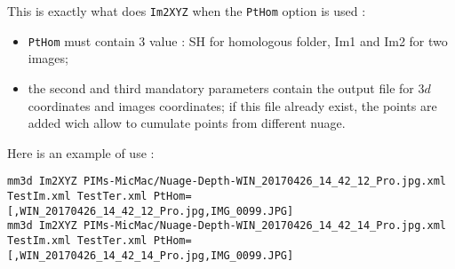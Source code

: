 This is exactly what does {\tt Im2XYZ} when the {\tt PtHom} option is used :

\begin{itemize}
    \item {\tt PtHom} must contain 3 value : SH for  homologous folder, Im1 and Im2 for two images;
    \item  the second and third mandatory parameters contain  the output file for $3d$ coordinates
           and images coordinates; if this file already exist, the points are added wich allow
           to cumulate points from different nuage.
\end{itemize}

Here is an example of use :

\begin{verbatim}
mm3d Im2XYZ PIMs-MicMac/Nuage-Depth-WIN_20170426_14_42_12_Pro.jpg.xml TestIm.xml TestTer.xml PtHom=[,WIN_20170426_14_42_12_Pro.jpg,IMG_0099.JPG]
mm3d Im2XYZ PIMs-MicMac/Nuage-Depth-WIN_20170426_14_42_14_Pro.jpg.xml TestIm.xml TestTer.xml PtHom=[,WIN_20170426_14_42_14_Pro.jpg,IMG_0099.JPG]
\end{verbatim}


